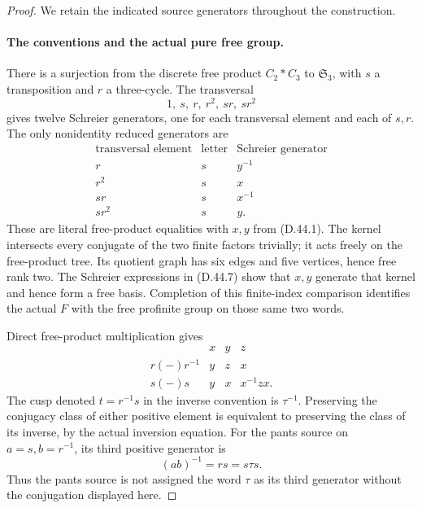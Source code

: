 \begin{proof}
We retain the indicated source generators throughout the construction.
\paragraph{The conventions and the actual pure free group.}
There is a surjection from the discrete free product
\(C_2*C_3\) to \(\mathfrak S_3\), with \(s\) a
transposition and \(r\) a three-cycle.
The transversal
\[
                      1,\ s,\ r,\ r^2,\ sr,\ sr^2
 \tag{D.44.6}
\]
gives twelve Schreier generators, one for each
transversal element and each of \(s,r\).
The only nonidentity reduced generators are
\[
 \begin{array}{c|c|c}
 \text{transversal element}&\text{letter}&
                          \text{Schreier generator}\\ \hline
 r&s&y^{-1}\\
 r^2&s&x\\
 sr&s&x^{-1}\\
 sr^2&s&y .
 \end{array}
 \tag{D.44.7}
\]
These are literal free-product equalities with
\(x,y\) from \textup{(D.44.1)}.
The kernel intersects every conjugate of the
two finite factors trivially; it acts freely
on the free-product tree.
Its quotient graph has six edges and five
vertices, hence free rank two.
The Schreier expressions in
\textup{(D.44.7)} show that \(x,y\) generate
that kernel and hence form a free basis.
Completion of this finite-index comparison
identifies the actual \(F\) with the free
profinite group on those same two words.

Direct free-product multiplication gives
\[
 \begin{array}{c|ccc}
       &x&y&z\\ \hline
 r(-)r^{-1}&y&z&x\\
 s(-)s&y&x&x^{-1}zx .
 \end{array}
 \tag{D.44.8}
\]
The cusp denoted \(t=r^{-1}s\) in the inverse
convention is \(\tau^{-1}\).
Preserving the conjugacy class of either
positive element is equivalent to preserving
the class of its inverse, by the actual
inversion equation.
For the pants source on \(a=s,b=r^{-1}\),
its third positive generator is
\[
             (ab)^{-1}=rs=s\tau s .
 \tag{D.44.9}
\]
Thus the pants source is not assigned the
word \(\tau\) as its third generator without
the conjugation displayed here.


\end{proof}
